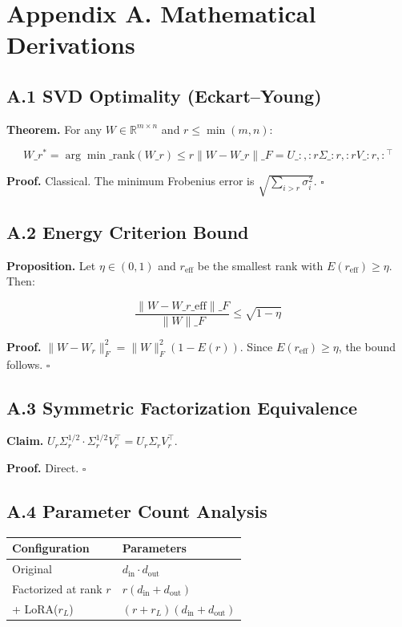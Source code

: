 
\section{Appendix A. Mathematical Derivations}

\subsection{A.1 SVD Optimality (Eckart--Young)}

\textbf{Theorem.} For any $W \in \mathbb{R}^{m \times n}$ and $r \leq \min(m, n)$:

\[
W\_r^* = \arg\min\_{\text{rank}(W\_r) \leq r} \|W - W\_r\|\_F = U\_{:, :r} \Sigma\_{:r, :r} V\_{:r, :}^\top
\tag{A.1}
\]

\textbf{Proof.} Classical. The minimum Frobenius error is $\sqrt{\sum_{i > r} \sigma_i^2}$. 
$\square$

\subsection{A.2 Energy Criterion Bound}

\textbf{Proposition.} Let $\eta \in (0, 1)$ and $r_\text{eff}$ be the smallest 
rank with $E(r_\text{eff}) \geq \eta$. Then:

\[
\frac{\|W - W\_{r\_\text{eff}}\|\_F}{\|W\|\_F} \leq \sqrt{1 - \eta}
\tag{A.2}
\]

\textbf{Proof.} $\|W - W_r\|_F^2 = \|W\|_F^2 (1 - E(r))$. Since $E(r_\text{eff}) \geq \eta$, 
the bound follows. $\square$

\subsection{A.3 Symmetric Factorization Equivalence}

\textbf{Claim.} $U_r \Sigma_r^{1/2} \cdot \Sigma_r^{1/2} V_r^\top = U_r \Sigma_r V_r^\top$.

\textbf{Proof.} Direct. $\square$

\subsection{A.4 Parameter Count Analysis}

\begin{table}[H]
\centering
\small
\begin{tabular}{ll}
\toprule
\textbf{Configuration} & \textbf{Parameters} \\
\midrule
Original & $d_\text{in} \cdot d_\text{out}$ \\
Factorized at rank $r$ & $r(d_\text{in} + d_\text{out})$ \\
+ LoRA($r_L$) & $(r + r_L)(d_\text{in} + d_\text{out})$ \\
\bottomrule
\end{tabular}
\end{table}


